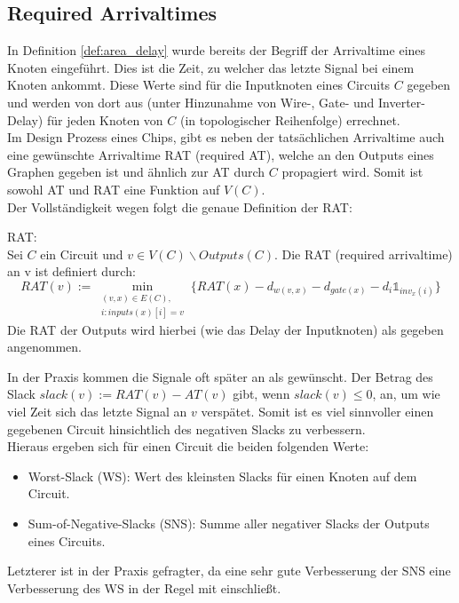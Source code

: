 \documentclass[11pt, a4paper, german]{article}
\begin{document}
\subsection{Required Arrivaltimes}
\label{subsec:rat}
In Definition \ref{def:area_delay} wurde bereits der Begriff der Arrivaltime eines Knoten eingeführt. Dies ist die Zeit, zu welcher das letzte Signal bei einem Knoten ankommt. Diese Werte sind für die Inputknoten eines Circuits $C$ gegeben und werden von dort aus (unter Hinzunahme von Wire-, Gate- und Inverter-Delay) für jeden Knoten von $C$ (in topologischer Reihenfolge) errechnet.\\
Im Design Prozess eines Chips, gibt es neben der tatsächlichen Arrivaltime auch eine  gewünschte Arrivaltime RAT (required AT), welche an den Outputs eines Graphen gegeben ist und ähnlich zur AT durch $C$ propagiert wird. Somit ist sowohl AT und RAT eine Funktion auf $V(C)$. \\
Der Vollständigkeit wegen folgt die genaue Definition der RAT:\\

\begin{definition}{RAT:}\\
	Sei $C$ ein Circuit und $v \in V(C)\backslash  Outputs(C)$. Die RAT (required arrivaltime) an v ist definiert durch:
	\[   RAT(v) := \min\limits_{ \substack{(v,x)\in E(C), \\ i: inputs(x)[i] = v }} \{ RAT(x) - d_{w(v,x)} - d_{gate(x)} - d_{i} \mathbb{1}_{inv_x(i)} \}\] 
	Die RAT der Outputs wird hierbei (wie das Delay der Inputknoten) als gegeben angenommen. 
\end{definition}

In der Praxis kommen die Signale oft später an als gewünscht. Der Betrag des Slack $slack(v) := RAT(v) - AT(v)$ gibt, wenn $slack(v) \leq 0 $, an, um wie viel Zeit sich das letzte Signal an $v$ verspätet. Somit ist es viel sinnvoller einen gegebenen Circuit hinsichtlich des negativen Slacks zu verbessern. \\
Hieraus ergeben sich für einen Circuit die beiden folgenden Werte: 
\begin{itemize}
	\item Worst-Slack (WS): Wert des kleinsten Slacks für einen Knoten auf dem Circuit.
	\item Sum-of-Negative-Slacks (SNS): Summe aller negativer Slacks der Outputs eines Circuits.
\end{itemize}
Letzterer ist in der Praxis gefragter, da eine sehr gute Verbesserung der SNS eine Verbesserung des WS in der Regel mit einschließt. \\
\end{document}
